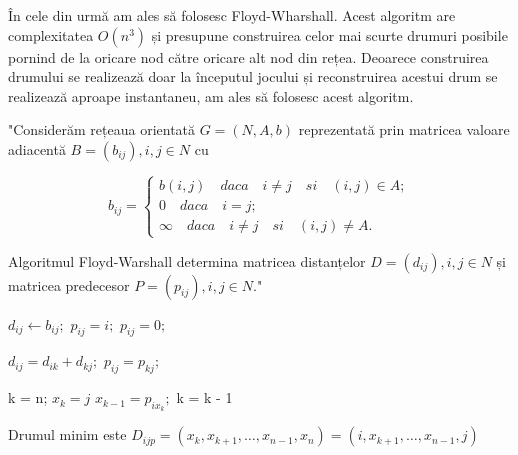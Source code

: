 \documentclass[12pt, a4paper]{article}
\begin{document}
 	În cele din urmă am ales să folosesc Floyd-Wharshall. Acest algoritm are complexitatea $O(n^3)$ și presupune construirea celor mai scurte drumuri posibile pornind de la oricare nod către oricare alt nod din rețea. Deoarece construirea drumului se realizează doar la începutul jocului și reconstruirea acestui drum se realizează aproape instantaneu, am ales să folosesc acest algoritm.
	\newline
	
	"Considerăm rețeaua orientată $G = (N, A, b)$ reprezentată prin matricea valoare adiacentă $B = (b_{ij}), i, j \in N$ cu
	
	\begin{equation*}
		b_{ij} = \begin{cases}
			b(i, j) \quad daca \quad i \neq j \quad si \quad (i, j) \in A; \\
			0 \quad daca \quad i = j; \\
			\infty \quad daca \quad i \neq j \quad si \quad (i, j) \neq A.
		\end{cases}
	\end{equation*}

	Algoritmul Floyd-Warshall determina matricea distanțelor $D = (d_{ij}), i, j \in N$ și matricea predecesor $P = (p_{ij}), i, j \in N$." \cite{grafuriAnul2}
	
	\begin{algorithmic}
					\State $d_{ij} \gets b_{ij};$
						\State $p_{ij} = i;$
					\Else
						\State $p_{ij} = 0;$
					\EndIf
				\EndFor
			\EndFor
			
							\State $d_{ij} = d_{ik} + d_{kj};$
							\State $p_{ij} = p_{kj};$
						\EndIf
					\EndFor
				\EndFor
			\EndFor
		\EndFunction
	\end{algorithmic}

	\begin{algorithmic}
		\Function{Reconstruire Drum}{}
			\State k = n;
			\State $x_k = j$
			\While{$x_k \neq i$}
				\State $x_{k - 1} = p_{ix_k};$
				\State k = k - 1
			\EndWhile
		\EndFunction
	\end{algorithmic}

	Drumul minim este $D_{ijp} = (x_k, x_{k+1}, \dots, x_{n-1}, x_n) = (i, x_{k+1}, \dots, x_{n-1}, j)$
	
	
	
\end{document}
